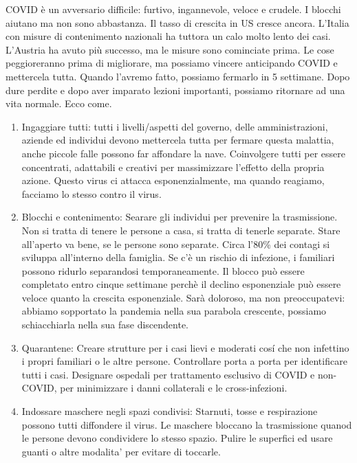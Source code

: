 \documentclass[onecolumn,journal]{IEEEtran}
\begin{document}
\begin{multicols}{2}
COVID è un avversario difficile: furtivo, ingannevole, veloce e crudele. I blocchi aiutano ma non sono abbastanza. Il tasso di crescita in US cresce ancora. L'Italia con misure di contenimento nazionali ha tuttora un calo molto lento dei casi. L'Austria ha avuto più successo, ma le misure sono cominciate prima. Le cose peggioreranno prima di migliorare, ma possiamo vincere anticipando COVID e mettercela tutta. Quando l'avremo fatto, possiamo fermarlo in 5 settimane. Dopo dure perdite e dopo aver imparato lezioni importanti, possiamo ritornare ad una vita normale. Ecco come.

\begin{enumerate}
\item Ingaggiare tutti: tutti i livelli/aspetti del governo, delle amministrazioni, aziende ed individui devono mettercela tutta per fermare questa malattia, anche piccole falle possono far affondare la nave. Coinvolgere tutti per essere concentrati, adattabili e creativi per massimizzare l'effetto della propria azione. Questo virus ci attacca esponenzialmente, ma quando reagiamo, facciamo lo stesso contro il virus.

\item Blocchi e contenimento: Searare gli individui per prevenire la trasmissione. Non si tratta di tenere le persone a casa, si tratta di tenerle separate. Stare all'aperto va bene, se le persone sono separate. Circa l'80\% dei contagi si sviluppa all'interno della famiglia. Se c'è un rischio di infezione, i familiari possono ridurlo separandosi temporaneamente. Il blocco può essere completato entro cinque settimane perchè il declino esponenziale può essere veloce quanto la crescita esponenziale. Sarà doloroso, ma non preoccupatevi: abbiamo sopportato la pandemia nella sua parabola crescente, possiamo schiacchiarla nella sua fase discendente.

\item Quarantene: Creare strutture per i casi lievi e moderati cosí che non infettino i propri familiari o le altre persone. Controllare porta a porta per identificare tutti i casi. Designare ospedali per trattamento esclusivo di COVID e non-COVID, per minimizzare i danni collaterali e le cross-infezioni.

\item Indossare maschere negli spazi condivisi: Starnuti, tosse e respirazione possono tutti diffondere il virus. Le maschere bloccano la trasmissione quanod le persone devono condividere lo stesso spazio. Pulire le superfici ed usare guanti o altre modalita' per evitare di toccarle.


\end{enumerate}
\end{multicols}
\end{document}

